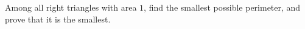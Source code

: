 Among all right triangles with area $1$, find the smallest possible perimeter, and prove that it is the smallest.
